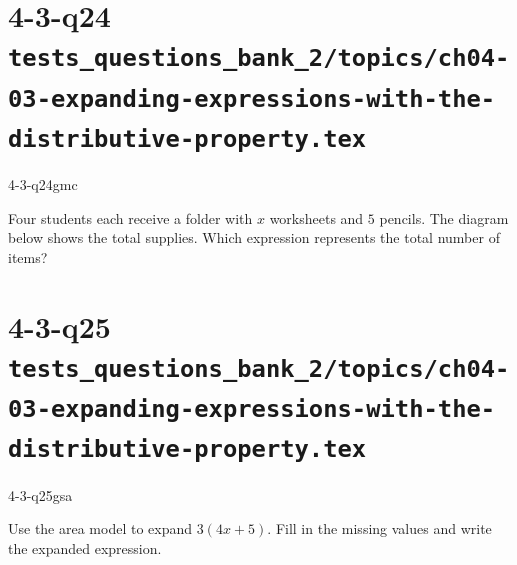 \documentclass[12pt, fleqn, openany]{studyGuide}
\begin{document}
\newpage
\section*{4-3-q24 \hfill \normalsize\texttt{tests\_questions\_bank\_2/topics/ch04-03-expanding-expressions-with-the-distributive-property.tex}}
\begin{practiceQuestion}{4-3-q24}{gmc}
\begin{questionText}
Four students each receive a folder with $x$ worksheets and $5$ pencils. The diagram below shows the total supplies. Which expression represents the total number of items?

\begin{center}
\end{center}
\end{questionText}
\end{practiceQuestion}

\newpage
\section*{4-3-q25 \hfill \normalsize\texttt{tests\_questions\_bank\_2/topics/ch04-03-expanding-expressions-with-the-distributive-property.tex}}
\begin{practiceQuestion}{4-3-q25}{gsa}
\begin{questionText}
Use the area model to expand $3(4x + 5)$. Fill in the missing values and write the expanded expression.

\begin{center}
\end{center}
\end{questionText}
\end{practiceQuestion}
\end{document}
